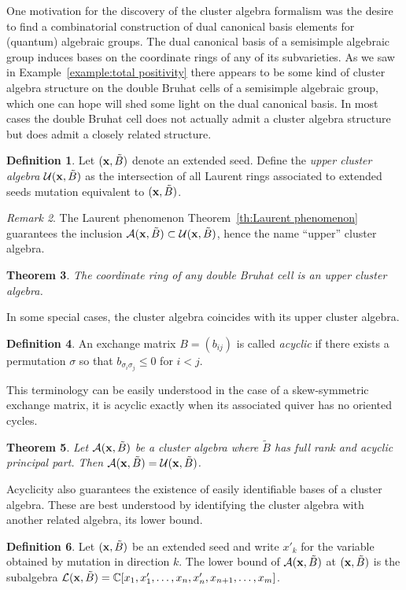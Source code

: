 \documentclass{amsart}
\newtheorem{theorem}{Theorem}[section]
\theoremstyle{definition}
\newtheorem{definition}[theorem]{Definition}
\theoremstyle{remark}
\newtheorem{remark}[theorem]{Remark}
\numberwithin{equation}{section}
\newcommand{\cA}{{\mathcal{A}}}
\newcommand{\cL}{{\mathcal{L}}}
\newcommand{\cU}{{\mathcal{U}}}
\newcommand{\x}{{\bf x}}
\newcommand{\CC}{{\mathbb{C}}}
\begin{document}
  One motivation for the discovery of the cluster algebra formalism was the desire to find a combinatorial construction of dual canonical basis elements for (quantum) algebraic groups.  The dual canonical basis of a semisimple algebraic group induces bases on the coordinate rings of any of its subvarieties.  As we saw in Example~\ref{example:total positivity} there appears to be some kind of cluster algebra structure on the double Bruhat cells of a semisimple algebraic group, which one can hope will shed some light on the dual canonical basis.  In most cases the double Bruhat cell does not actually admit a cluster algebra structure but does admit a closely related structure.

  \begin{definition}
    Let $(\x,\tilde B)$ denote an extended seed.  Define the \emph{upper cluster algebra} $\cU(\x,\tilde B)$ as the intersection of all Laurent rings associated to extended seeds mutation equivalent to $(\x,\tilde B)$.
  \end{definition}

  \begin{remark}
    The Laurent phenomenon Theorem~\ref{th:Laurent phenomenon} guarantees the inclusion $\cA(\x,\tilde B)\subset\cU(\x,\tilde B)$, hence the name ``upper'' cluster algebra.
  \end{remark}

  \begin{theorem}
    The coordinate ring of any double Bruhat cell is an upper cluster algebra.
  \end{theorem}

  In some special cases, the cluster algebra coincides with its upper cluster algebra.
  \begin{definition}
    An exchange matrix $B=(b_{ij})$ is called \emph{acyclic} if there exists a permutation $\sigma$ so that $b_{\sigma_i\sigma_j}\le 0$ for $i<j$.
  \end{definition}
  This terminology can be easily understood in the case of a skew-symmetric exchange matrix, it is acyclic exactly when its associated quiver has no oriented cycles.

  \begin{theorem}
    Let $\cA(\x,\tilde B)$ be a cluster algebra where $\tilde B$ has full rank and acyclic principal part.  Then $\cA(\x,\tilde B)=\cU(\x,\tilde B)$.
  \end{theorem}

  Acyclicity also guarantees the existence of easily identifiable bases of a cluster algebra.  These are best understood by identifying the cluster algebra with another related algebra, its lower bound.
  \begin{definition}
    Let $(\x,\tilde B)$ be an extended seed and write $x'_k$ for the variable obtained by mutation in direction $k$.  The lower bound of $\cA(\x,\tilde B)$ at $(\x,\tilde B)$ is the subalgebra $\cL(\x,\tilde B)=\CC[x_1,x'_1,\ldots,x_n,x'_n,x_{n+1},\ldots,x_m]$.
  \end{definition}
\end{document}
